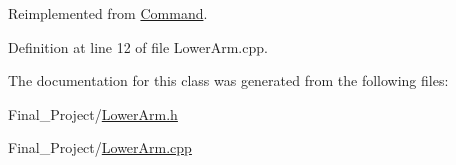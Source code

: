 Reimplemented from \hyperlink{classCommand_ae5846b4332a262e055c7a96759fa18f2}{Command}.



Definition at line 12 of file Lower\-Arm.\-cpp.



The documentation for this class was generated from the following files\-:\begin{DoxyCompactItemize}
\item 
Final\-\_\-\-Project/\hyperlink{LowerArm_8h}{Lower\-Arm.\-h}\item 
Final\-\_\-\-Project/\hyperlink{LowerArm_8cpp}{Lower\-Arm.\-cpp}\end{DoxyCompactItemize}
